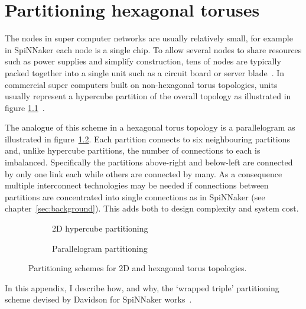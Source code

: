 \chapter{Partitioning hexagonal toruses}
	
	\label{sec:partitioning}
	
	The nodes in super computer networks are usually relatively small, for
	example in SpiNNaker each node is a single chip. To allow several nodes to
	share resources such as power supplies and simplify construction, tens of
	nodes are typically packed together into a single unit such as a circuit
	board or server blade~\cite{gilge14,ajima12}. In commercial super computers
	built on non-hexagonal torus topologies, units usually represent a hypercube
	partition of the overall topology as illustrated in figure
	\ref{fig:apdx-hypercube-partitioning}~\cite{chen11,ajima12}.
	
	
	The analogue of this scheme in a hexagonal torus topology is a parallelogram
	as illustrated in figure~\ref{fig:apdx-parallelogram-partitioning}.  Each
	partition connects to six neighbouring partitions and, unlike hypercube
	partitions, the number of connections to each is imbalanced.  Specifically
	the partitions above-right and below-left are connected by only one link each
	while others are connected by many. As a consequence multiple interconnect
	technologies may be needed if connections between partitions are concentrated
	into single connections as in SpiNNaker (see chapter~\ref{sec:background}).
	This adds both to design complexity and system cost.
	
	\begin{figure}
		\center
		\begin{subfigure}[b]{0.45\textwidth}
			\center
			\caption{2D hypercube partitioning}
			\label{fig:apdx-hypercube-partitioning}
		\end{subfigure}
		\begin{subfigure}[b]{0.45\textwidth}
			\center
			\caption{Parallelogram partitioning}
			\label{fig:apdx-parallelogram-partitioning}
		\end{subfigure}
		
		\caption{Partitioning schemes for 2D and hexagonal torus topologies.}
		\label{fig:apdx-partitioning-options}
	\end{figure}
	
	In this appendix, I describe how, and why, the `wrapped triple' partitioning
	scheme devised by Davidson for SpiNNaker works~\cite{davidsonWiring}.
	
